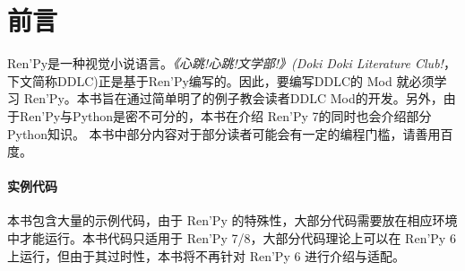 \chapter*{前言}

Ren'Py是一种视觉小说语言。{\itshape 《心跳!心跳!文学部!》(Doki Doki Literature Club!}，下文简称DDLC)正是基于Ren'Py编写的。因此，要编写DDLC的 Mod 就必须学习 Ren'Py。本书旨在通过简单明了的例子教会读者DDLC Mod的开发。另外，由于Ren'Py与Python是密不可分的，本书在介绍 Ren'Py 7的同时也会介绍部分Python知识。
本书中部分内容对于部分读者可能会有一定的编程门槛，请善用百度。

\subsubsection*{实例代码}
本书包含大量的示例代码，由于 Ren'Py 的特殊性，大部分代码需要放在相应环境中才能运行。本书代码只适用于 Ren'Py 7/8，大部分代码理论上可以在 Ren'Py 6 上运行，但由于其过时性，本书将不再针对 Ren'Py 6 进行介绍与适配。

